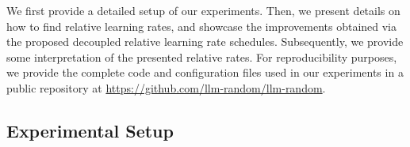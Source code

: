\documentclass{article} %
\newcommand{\ka}[1]{\textcolor{magenta}{[KA: #1]}}
\newcommand{\jl}[1]{\textcolor{green}{[JL: #1]}}
\newcommand{\jmr}[2]{\textcolor{purple}{[JM:] \sout{#1} #2}}
\begin{document}
    We first provide a detailed setup of our experiments. Then, we present details on how to find relative learning rates, and showcase the improvements obtained via the proposed decoupled relative learning rate schedules. Subsequently, we provide some interpretation of the presented relative rates. For reproducibility purposes, we provide the complete code and configuration files used in our experiments in a public repository at \url{https://github.com/llm-random/llm-random}.

    \subsection{Experimental Setup}





\end{document}
